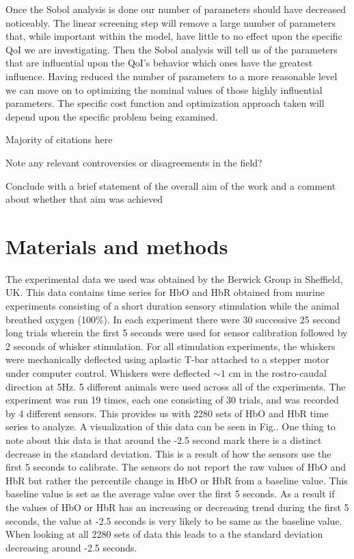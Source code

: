 \documentclass[10pt,letterpaper]{article}
\begin{document}
	Once the Sobol analysis is done our number of parameters should have decreased noticeably. The linear screening step will remove a large number of parameters that, while important within the model, have little to no effect upon the specific QoI we are investigating. Then the Sobol analysis will tell us of the parameters that are influential upon the QoI's behavior which ones have the greatest influence. Having reduced the number of parameters to a more reasonable level we can move on to optimizing the nominal values of those highly influential parameters. The specific cost function and optimization approach taken will depend upon the specific problem being examined.
	
	\textinterrobang Majority of citations here 
	
	\textinterrobang Note any relevant controversies or disagreements in the field?
	
	
	Conclude with a brief statement of the overall aim of the work and a comment about whether that aim was achieved
	
	
	
	\section*{Materials and methods}
	
	
	
	
	The experimental data we used was obtained by the Berwick Group in Sheffield, UK. This data contains time series for HbO and HbR obtained from murine experiments consisting of a short duration sensory stimulation while the animal breathed oxygen (100\%). In each experiment there were 30 successive 25 second long trials wherein the first 5 seconds were used for sensor calibration followed by 2 seconds of whisker stimulation. For all stimulation experiments, the whiskers were mechanically deflected using aplastic T-bar attached to a stepper motor under computer control. Whiskers were deflected $\sim1$ cm in the rostro-caudal direction at 5Hz. 5 different animals were used across all of the experiments. The experiment was run 19 times, each one consisting of 30 trials, and was recorded by 4 different sensors. This provides us with 2280 sets of HbO and HbR time series to analyze. A visualization of this data can be seen in Fig.. One thing to note about this data is that around the -2.5 second mark there is a distinct decrease in the standard deviation. This is a result of how the sensors use the first 5 seconds to calibrate. The sensors do not report the raw values of HbO and HbR but rather the percentile change in HbO or HbR from a baseline value. This baseline value is set as the average value over the first 5 seconds. As a result if the values of HbO or HbR has an increasing or decreasing trend during the first 5 seconds, the value at -2.5 seconds is very likely to be same as the baseline value. When looking at all 2280 sets of data this leads to a the standard deviation decreasing around -2.5 seconds.
	
\end{document}
